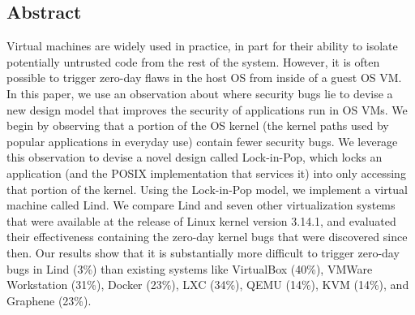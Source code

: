 \subsection*{Abstract}
Virtual machines are widely used in practice, in part for their ability to
isolate potentially untrusted code from the rest of the system.
However, it is often possible to trigger zero-day flaws
in the host OS from inside of a guest OS VM.  %
In this paper, we use an observation about where security bugs lie to
devise a new design model that improves the security of applications
run in OS VMs.  %
We begin by observing that a portion of the OS kernel (the kernel paths used 
by popular applications in everyday use) contain fewer security bugs. We 
leverage this observation to devise a novel design called Lock-in-Pop, which 
locks an application (and the POSIX implementation that services it) into only 
accessing that portion of the kernel.  Using the Lock-in-Pop model, we 
implement a virtual machine called Lind.
We compare Lind and seven other virtualization systems that were
available at the release of Linux kernel version 3.14.1, and evaluated
their effectiveness containing the zero-day kernel bugs that were discovered 
since then.
Our results show that it is substantially more difficult to trigger zero-day bugs in 
Lind (3\%) than existing systems like VirtualBox (40\%), VMWare Workstation
(31\%), Docker (23\%), LXC (34\%), QEMU (14\%), KVM (14\%), and Graphene (23\%).
